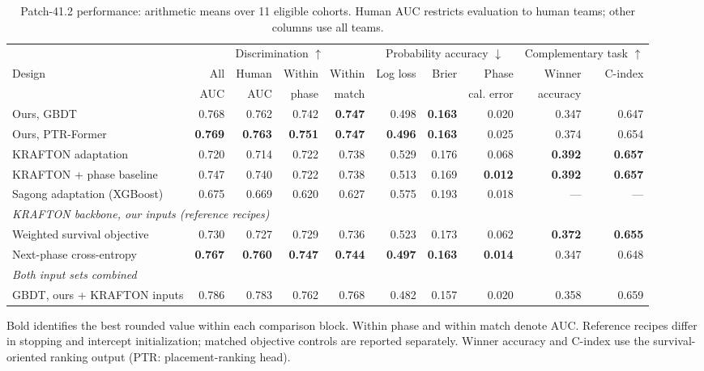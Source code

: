 \begin{table}[t]
\centering\footnotesize
\caption{Patch-41.2 performance: arithmetic means over 11 eligible cohorts. Human AUC restricts evaluation to human teams; other columns use all teams.}
\label{tab:main}
\setlength{\tabcolsep}{2.5pt}
\begin{tabular*}{\textwidth}{@{\extracolsep{\fill}}lrrrrrrrrr@{}}
\toprule
 & \multicolumn{4}{c}{Discrimination $\uparrow$} & \multicolumn{3}{c}{Probability accuracy $\downarrow$} & \multicolumn{2}{c}{Complementary task $\uparrow$} \\
\cmidrule(lr){2-5}\cmidrule(lr){6-8}\cmidrule(lr){9-10}
Design & All & Human & Within & Within & Log loss & Brier & Phase & Winner & C-index \\
 & AUC & AUC & phase & match & & & cal. error & accuracy & \\
\midrule
Ours, GBDT & 0.768 & 0.762 & 0.742 & \textbf{0.747} & 0.498 & \textbf{0.163} & 0.020 & 0.347 & 0.647 \\
Ours, PTR-Former & \textbf{0.769} & \textbf{0.763} & \textbf{0.751} & \textbf{0.747} & \textbf{0.496} & \textbf{0.163} & 0.025 & 0.374 & 0.654 \\
KRAFTON adaptation & 0.720 & 0.714 & 0.722 & 0.738 & 0.529 & 0.176 & 0.068 & \textbf{0.392} & \textbf{0.657} \\
KRAFTON + phase baseline & 0.747 & 0.740 & 0.722 & 0.738 & 0.513 & 0.169 & \textbf{0.012} & \textbf{0.392} & \textbf{0.657} \\
Sagong adaptation (XGBoost) & 0.675 & 0.669 & 0.620 & 0.627 & 0.575 & 0.193 & 0.018 & --- & --- \\
\midrule
\multicolumn{10}{l}{\emph{KRAFTON backbone, our inputs (reference recipes)}} \\
Weighted survival objective & 0.730 & 0.727 & 0.729 & 0.736 & 0.523 & 0.173 & 0.062 & \textbf{0.372} & \textbf{0.655} \\
Next-phase cross-entropy & \textbf{0.767} & \textbf{0.760} & \textbf{0.747} & \textbf{0.744} & \textbf{0.497} & \textbf{0.163} & \textbf{0.014} & 0.347 & 0.648 \\
\midrule
\multicolumn{10}{l}{\emph{Both input sets combined}} \\
GBDT, ours + KRAFTON inputs & 0.786 & 0.783 & 0.762 & 0.768 & 0.482 & 0.157 & 0.020 & 0.358 & 0.659 \\
\bottomrule
\end{tabular*}
\smallskip
\parbox{\textwidth}{\scriptsize Bold identifies the best rounded value within each comparison block. Within phase and within match denote AUC. Reference recipes differ in stopping and intercept initialization; matched objective controls are reported separately. Winner accuracy and C-index use the survival-oriented ranking output (PTR: placement-ranking head).}
\end{table}
